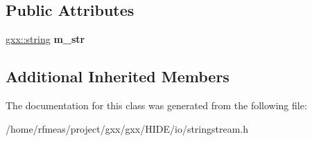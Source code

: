 \subsection*{Public Attributes}
\begin{DoxyCompactItemize}
\item 
\hyperlink{classgxx_1_1basic__string}{gxx\+::string} {\bfseries m\+\_\+str}\hypertarget{classgxx_1_1stringstream_a0a4e2d23fbe4ff244e519c87dd54a571}{}\label{classgxx_1_1stringstream_a0a4e2d23fbe4ff244e519c87dd54a571}

\end{DoxyCompactItemize}
\subsection*{Additional Inherited Members}


The documentation for this class was generated from the following file\+:\begin{DoxyCompactItemize}
\item 
/home/rfmeas/project/gxx/gxx/\+H\+I\+D\+E/io/stringstream.\+h\end{DoxyCompactItemize}

